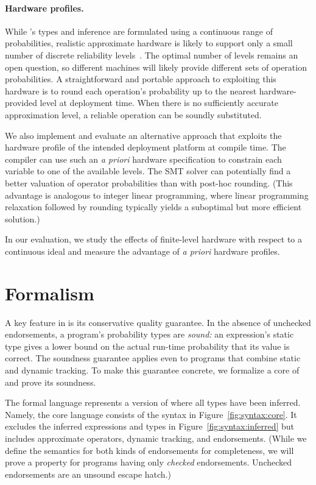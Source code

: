 \documentclass[10pt,nocopyrightspace,preprint]{sigplanconf}
\begin{document}
\paragraph{Hardware profiles.}

While \lang's types and inference are formulated using a continuous range of
probabilities, realistic approximate hardware is likely to support only a
small number of discrete reliability levels~\cite{truffle, quora}.
The optimal number of levels remains an open question, so different machines
will likely provide different sets of operation probabilities.
A straightforward and portable approach to exploiting this hardware is to
round each operation's probability up to the nearest hardware-provided level
at deployment time.
When there is no sufficiently accurate approximation level, a reliable
operation can be soundly substituted.

We also implement and evaluate an alternative approach that exploits the
hardware profile of the intended deployment platform at compile time.
The compiler can use such an \emph{a priori} hardware specification to
constrain each variable to one of the available levels.
The SMT solver can potentially find a better valuation of operator
probabilities than with post-hoc rounding.
(This advantage is analogous to integer linear programming, where linear
programming relaxation followed by rounding typically yields a suboptimal but
more efficient solution.)

In our evaluation, we study the effects of finite-level hardware with respect
to a continuous ideal and measure the advantage of \emph{a priori} hardware
profiles.


\section{Formalism}
\label{sec:semantics}

A key feature in \lang is its conservative quality guarantee.
In the absence of unchecked endorsements, a \lang program's probability types
are \emph{sound:} an expression's static type gives a lower bound on the actual
run-time probability that its value is correct.
The soundness guarantee applies
even to programs that combine static and dynamic tracking.
To make this guarantee concrete, we formalize a core of \lang and prove its
soundness.

The formal language represents a version of \lang where all types have been
inferred.
Namely, the core language consists of the syntax in
Figure~\ref{fig:syntax:core}.
It excludes the inferred expressions and types in
Figure~\ref{fig:syntax:inferred} but
includes approximate operators, dynamic tracking, and endorsements.
(While we define the semantics for both kinds of endorsements for
completeness, we will prove a property for programs having only \emph{checked}
endorsements. Unchecked endorsements are an unsound escape hatch.)
\end{document}
